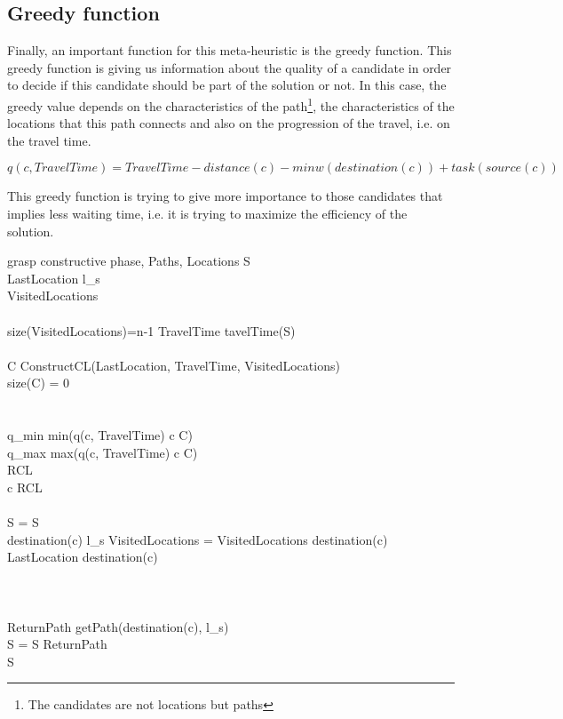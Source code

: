 \documentclass[]{report}
\begin{document}
\subsection{Greedy function}
Finally, an important function for this meta-heuristic is the greedy function. This greedy function is giving us information about the quality of a candidate in order to decide if this candidate should be part of the solution or not. In this case, the greedy value depends on the characteristics of the path\footnote{The candidates are not locations but paths}, the characteristics of the locations that this path connects and also on the progression of the travel, i.e. on the travel time. 

$$ q(c, TravelTime) = TravelTime - distance(c) - minw(destination(c)) + task(source(c))$$

This greedy function is trying to give more importance to those candidates that implies less waiting time, i.e. it is trying to maximize the efficiency of the solution.

\begin{pseudocode}{grasp constructive phase}{\alpha, Paths, Locations}
\label{pc:constructive_phase}
	S \GETS \varnothing\\
	LastLocation \GETS l_{s}\\
	VisitedLocations \GETS \varnothing\\
	\\
	\WHILE \NOT size(VisitedLocations)=n-1 \DO
	\BEGIN
		TravelTime \GETS tavelTime(S)\\
		\\
		C \GETS ConstructCL(LastLocation, TravelTime, VisitedLocations)\\
		\IF size(C) = 0 \THEN
			\\
		
		\\
		\\
		q_{min} \GETS min(q(c, TravelTime) \quad \forall c \in C)\\
		q_{max} \GETS max(q(c, TravelTime) \quad \forall c \in C)\\
		RCL \\
		 c \in RCL \\
		\\
		S = S \\
		\IF destination(c) \neq l_{s} \THEN
			VisitedLocations = VisitedLocations \cup destination(c)\\
		LastLocation \GETS destination(c)\\
	\END\\
	\\
	\\
	ReturnPath \GETS getPath(destination(c), l_{s})\\
	S = S \cup ReturnPath\\
	
	\RETURN S

\end{pseudocode}
\end{document}
